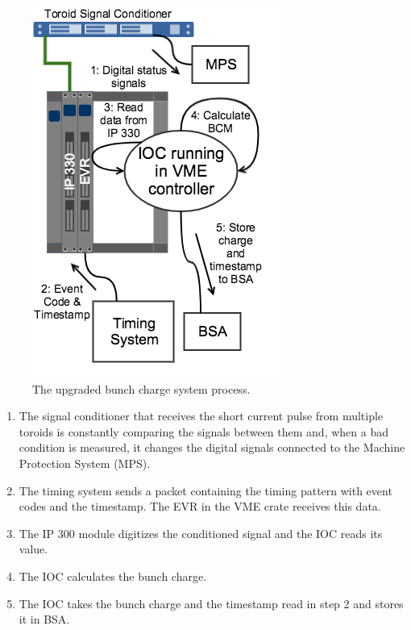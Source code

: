 \documentclass[letter,
               biblatex,     %
               keeplastbox,   %
               ]{jacow}
\begin{document}
\begin{figure}[!htb]
   \centering
   \includegraphics*[width=\columnwidth]{BCM_VME_Process}
   \caption{The upgraded bunch charge system process.}
   \label{fig:bcm_vme}
\end{figure}

\begin{enumerate}
   \item The signal conditioner that receives the short current pulse from multiple toroids is constantly comparing the signals between them and, when a bad condition is measured, it changes the digital signals connected to the Machine Protection System (MPS).
   \item The timing system sends a packet containing the timing pattern with event codes and the timestamp. The EVR in the VME crate receives this data.
   \item The IP 300 module digitizes the conditioned signal and the IOC reads its value.
   \item The IOC calculates the bunch charge.
   \item The IOC takes the bunch charge and the timestamp read in step 2 and stores it in BSA.
\end{enumerate}
\end{document}
